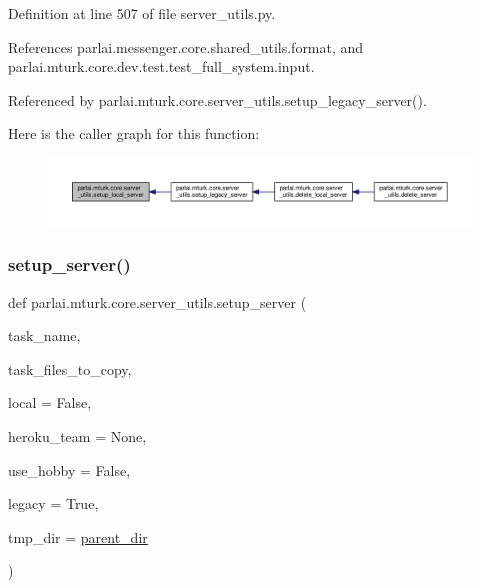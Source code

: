 Definition at line 507 of file server\+\_\+utils.\+py.



References parlai.\+messenger.\+core.\+shared\+\_\+utils.\+format, and parlai.\+mturk.\+core.\+dev.\+test.\+test\+\_\+full\+\_\+system.\+input.



Referenced by parlai.\+mturk.\+core.\+server\+\_\+utils.\+setup\+\_\+legacy\+\_\+server().

Here is the caller graph for this function\+:
\nopagebreak
\begin{figure}[H]
\begin{center}
\leavevmode
\includegraphics[width=350pt]{namespaceparlai_1_1mturk_1_1core_1_1server__utils_a9d4c4937ea60bd74630a44739e825ebf_icgraph}
\end{center}
\end{figure}
\mbox{\label{namespaceparlai_1_1mturk_1_1core_1_1server__utils_a154e8cbb18375ff8fd6730154d312bbc}} 
\subsubsection{\texorpdfstring{setup\+\_\+server()}{setup\_server()}}
{\footnotesize\ttfamily def parlai.\+mturk.\+core.\+server\+\_\+utils.\+setup\+\_\+server (\begin{DoxyParamCaption}\item[{}]{task\+\_\+name,  }\item[{}]{task\+\_\+files\+\_\+to\+\_\+copy,  }\item[{}]{local = {\ttfamily False},  }\item[{}]{heroku\+\_\+team = {\ttfamily None},  }\item[{}]{use\+\_\+hobby = {\ttfamily False},  }\item[{}]{legacy = {\ttfamily True},  }\item[{}]{tmp\+\_\+dir = {\ttfamily \hyperlink{namespaceparlai_1_1mturk_1_1core_1_1server__utils_a193439bdbc25a32b00f1a43e6f8532d8}{parent\+\_\+dir}} }\end{DoxyParamCaption})}



